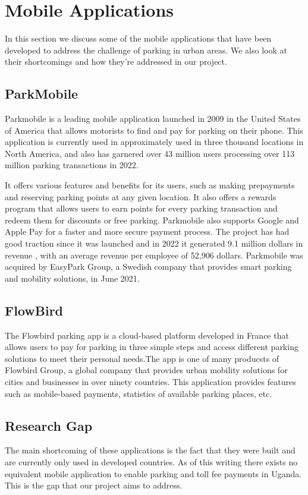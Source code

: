 \section{Mobile Applications}
In this section we discuss some of the mobile applications that have been developed to address the challenge of parking in urban areas. We also look at their shortcomings and how they're addressed in our project.

\subsection{ParkMobile}
Parkmobile is a leading mobile application launched in 2009 in the United States of America that allows motorists to find and pay for parking on their phone. This application is currently used in approximately used in three thousand locations in North America, and also has garnered over 43 million users processing over 113 million parking transactions in 2022.

It offers various features and benefits for its users, such as making prepayments and reserving parking points at any given location. It also offers a rewards program that allows users to earn points for every parking transaction and redeem them for discounts or free parking. Parkmobile also supports Google and Apple Pay for a faster and more secure payment process. \cite{ParkMobile2023}
The project has had good traction since it was launched and in 2022 it generated 9.1 million dollars in revenue , with an average revenue per employee of 52,906 dollars. Parkmobile was acquired by EasyPark Group, a Swedish company that provides smart parking and mobility solutions, in June 2021.

\subsection{FlowBird}
The Flowbird parking app is a cloud-based platform developed in France that allows users to pay for parking in three simple steps and access different parking solutions to meet their personal needs.The app is one of many producsts of Flowbird Group, a global company that provides urban mobility solutions for cities and businesses in over ninety countries. This application provides features such as mobile-based payments, statistics of available parking places, etc\cite{Flowbird2023}.

\subsection{Research Gap}
The main shortcoming of these applications is the fact that they were built and are currently only used in developed countries. As of this writing there exists no equivalent mobile application to enable parking and toll fee payments in Uganda. This is the gap that our project aims to address.


